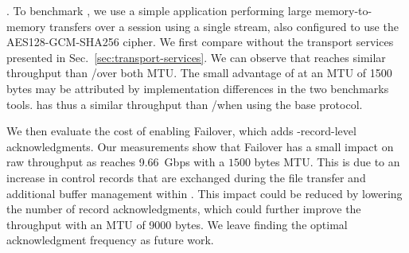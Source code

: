 \textbf{\tcpls}.
To benchmark \tcpls, we use a simple application performing large
memory-to-memory transfers over a \tcpls session using a single stream, also
configured to use the AES128-GCM-SHA256 cipher.
We first compare \tcpls without the transport services presented in Sec.~\ref{sec:transport-services}. We can observe that \tcpls reaches similar throughput than \tls/\tcp over both MTU. The small advantage of \tcpls at an MTU of 1500 bytes may be attributed by implementation differences in the two benchmarks tools. \tcpls has thus a similar throughput than \tcp/\tls when using the base protocol. %



We then evaluate the cost of enabling Failover, which adds \tcpls-record-level
acknowledgments. %
Our measurements show that Failover has a small impact on raw throughput as
\tcpls reaches 9.66~Gbps with a $1500$ bytes MTU. This is due to an increase in control records that are exchanged during the file transfer and additional buffer management within \tcpls. This impact could be reduced by lowering the number of record acknowledgments, which could further improve the throughput with an MTU of 9000 bytes. We leave finding the optimal acknowledgment frequency as future work.


